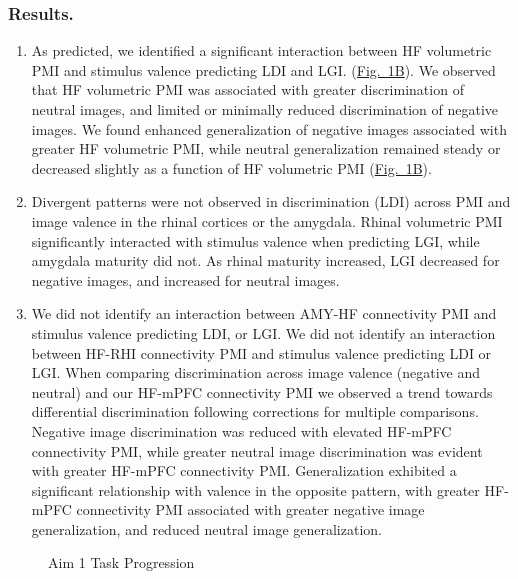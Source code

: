 \documentclass[11pt]{article}
\begin{document}
\subsubsection*{Results.}
\begin{enumerate}
    \item As predicted, we identified a significant interaction between HF volumetric PMI and stimulus valence predicting LDI and LGI\@.
          (\hyperref[fig:1]{Fig.\ 1B}). We observed that HF volumetric PMI was associated with
          greater discrimination of neutral images, and limited or minimally reduced discrimination of negative images. We found enhanced
          generalization of negative images associated with greater HF volumetric PMI, while neutral generalization remained steady or
          decreased slightly as a function of HF volumetric PMI (\hyperref[fig:1]{Fig.\ 1B}).
    \item Divergent patterns were not observed in
          discrimination (LDI) across PMI and image valence in the rhinal cortices or the
          amygdala. Rhinal volumetric PMI significantly interacted with
          stimulus valence when predicting LGI, while amygdala maturity did not. As
          rhinal maturity increased, LGI decreased for negative
          images, and increased for neutral images.
    \item We did
          not identify an interaction between AMY-HF connectivity PMI and stimulus valence predicting LDI,
          or LGI\@. We did
          not identify an interaction between HF-RHI connectivity PMI and stimulus valence predicting LDI or LGI\@. When comparing
          discrimination across image valence (negative and neutral) and our HF-mPFC connectivity
          PMI we observed a trend towards differential discrimination following corrections for
          multiple comparisons. Negative image discrimination was reduced with elevated
          HF-mPFC connectivity PMI, while greater neutral image discrimination was evident with greater
          HF-mPFC connectivity PMI\@. Generalization exhibited a significant relationship
          with valence in the opposite pattern, with greater HF-mPFC connectivity PMI
          associated with greater negative image generalization, and reduced neutral image generalization.
\end{enumerate}
\begin{figure}%
    \centering
    \qquad
    \caption{Aim 1 Task Progression}%
    \label{fig:1}%
\end{figure}
\end{document}
